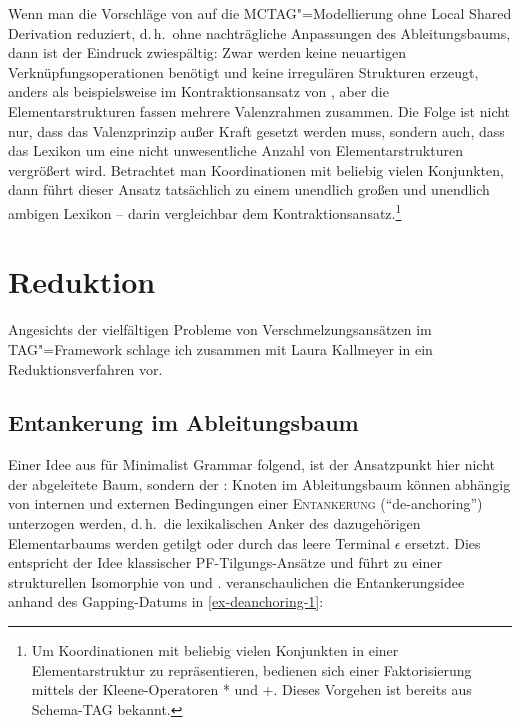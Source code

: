 Wenn man die Vorschläge von \cite{Seddah:etal:10} auf die MCTAG"=Modellierung ohne Local Shared Derivation reduziert, d.\,h.\ ohne nachträgliche Anpassungen des Ableitungsbaums, dann ist der Eindruck zwiespältig: Zwar werden keine neuartigen Verknüpfungsoperationen benötigt und keine irregulären Strukturen erzeugt, anders als beispielsweise im Kontraktionsansatz von \cite{Sarkar:Joshi:97}, aber die Elementarstrukturen fassen mehrere Valenzrahmen zusammen. Die Folge  ist nicht nur, dass das Valenzprinzip au\ss er Kraft gesetzt werden muss, sondern auch, dass das Lexikon um eine nicht unwesentliche Anzahl von Elementarstrukturen vergrö\ss ert wird. Betrachtet man Koordinationen mit beliebig vielen Konjunkten, dann führt dieser Ansatz tatsächlich zu einem unendlich gro\ss en und unendlich ambigen Lexikon -- darin vergleichbar dem Kontraktionsansatz.\footnote{Um Koordinationen mit beliebig vielen Konjunkten in einer Elementarstruktur zu repräsentieren, bedienen sich \cite{Seddah:etal:10} einer Faktorisierung mittels der Kleene-Operatoren * und +. Dieses Vorgehen ist bereits aus Schema-TAG \citep{Harbusch:00b} bekannt.}    



\section{Reduktion} \label{sec-deanchoring}

Angesichts der vielfältigen Probleme von Verschmelzungsansätzen im TAG"=Framework schlage ich zusammen mit Laura Kallmeyer in \cite{Lichte:Kallmeyer:10} ein Reduktionsverfahren vor. 

\subsection{Entankerung im Ableitungsbaum}

Einer Idee aus \cite{Kobele:09} für Minimalist Gram\-mar folgend, ist der Ansatzpunkt hier nicht der abgeleitete Baum, sondern der : Knoten im Ableitungsbaum können abhängig von internen und externen Bedingungen einer \textsc{Entankerung} ("`de-anchoring"') unterzogen werden, d.\,h.\ die lexikalischen Anker des dazugehörigen Elementarbaums werden getilgt oder durch das leere Terminal $\epsilon$ ersetzt. Dies entspricht der Idee klassischer PF-Tilgungs-Ansätze und führt zu einer strukturellen Isomorphie von  und . \cite{Lichte:Kallmeyer:10} veranschaulichen die Ent\-anker\-ungs\-idee anhand des Gapping-Datums in \ref{ex-deanchoring-1}: 

